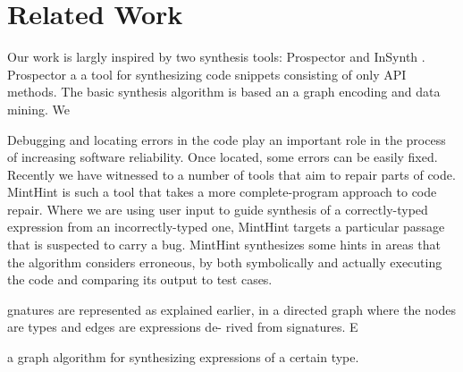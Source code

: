 \section{Related Work}
\label{sec:related}

Our work is largly inspired by two synthesis tools: Prospector \cite{MandelinetALL2005Jungloid} and InSynth \cite{GveroETAL13CompleteCompletionTypesWeights}.
Prospector a a tool for synthesizing code snippets consisting of only API methods. The basic synthesis algorithm is based an a graph encoding and data mining. We 



Debugging and locating errors in the code \cite{Pavlinovic:2014,
  Chandra:2011:AD} play an important role in the process of increasing
software reliability. Once located, some errors can be easily
fixed. Recently we have witnessed to a number of tools that aim to
repair parts of code. MintHint \cite{MintHint} is such a tool that
takes a more complete-program approach to code repair. Where we are
using user input to guide synthesis of a correctly-typed expression
from an incorrectly-typed one, MintHint targets a particular passage
that is suspected to carry a bug. MintHint synthesizes some hints in
areas that the algorithm considers erroneous, by both symbolically and
actually executing the code and comparing its output to test cases.




gnatures are represented as explained earlier, in a directed
graph where the nodes are types and edges are expressions de-
rived from signatures. E


a graph algorithm for synthesizing expressions of a certain type. 

